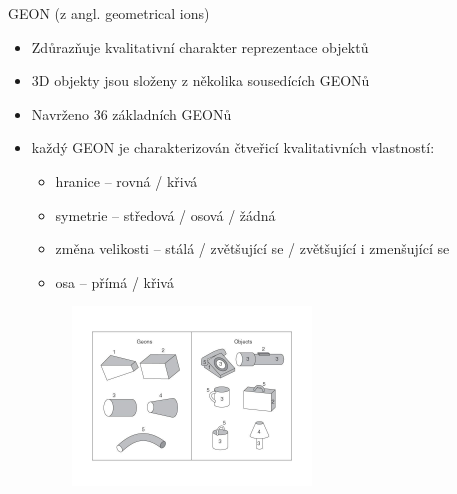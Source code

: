 \begin{frame}
GEON (z angl. geometrical ions)
\begin{itemize}
	\item  Zdůrazňuje  kvalitativní  charakter  reprezentace  objektů
	\item  3D objekty  jsou  složeny  z několika  sousedících GEONů
	\item Navrženo 36 základních GEONů
	\item každý GEON je charakterizován čtveřicí kvalitativních vlastností:
	    \begin{itemize}
	    \item hranice – rovná / křivá 
	    \item symetrie – středová / osová / žádná 
	    \item změna velikosti – stálá / zvětšující se / zvětšující i zmenšující se 
	    \item osa – přímá / křivá
	    \end{itemize}
	\begin{figure}[!ht]
	\centering
	\includegraphics[width = 0.6\textwidth]{./geons}
	\end{figure}
\end{itemize}
\end{frame}






\subsection{}



